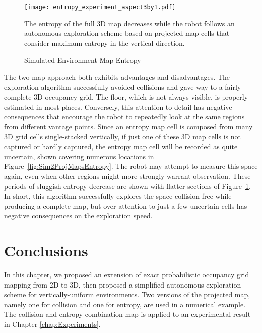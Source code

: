 \begin{figure}[!t]
	\centering
	\texttt{[image: entropy\_experiment\_aspect3by1.pdf]}
	\caption{Simulated Environment Map Entropy}
	\medskip
	\small
	The entropy of the full 3D map decreases while the robot follows an autonomous exploration scheme based on projected map cells that consider maximum entropy in the vertical direction.
	\label{fig:simH}
\end{figure}

The two-map approach both exhibits advantages and disadvantages. The exploration algorithm successfully avoided collisions and gave way to a fairly complete 3D occupancy grid. The floor, which is not always visible, is properly estimated in most places. Conversely, this attention to detail has negative consequences that encourage the robot to repeatedly look at the same regions from different vantage points.
Since an entropy map cell is composed from many 3D grid cells single-stacked vertically, if just one of these 3D map cells is not captured or hardly captured, the entropy map cell will be recorded as quite uncertain, shown covering numerous locations in Figure~\ref{fig:Sim2ProjMapsEntropy}. The robot may attempt to measure this space again, even when other regions might more strongly warrant observation. These periods of sluggish entropy decrease are shown with flatter sections of Figure~\ref{fig:simH}. In short, this algorithm successfully explores the space collision-free while producing a complete map, but over-attention to just a few uncertain cells has negative consequences on the exploration speed.








\section{Conclusions}

In this chapter, we proposed an extension of exact probabilistic occupancy grid mapping from 2D to 3D, then proposed a simplified autonomous exploration scheme for vertically-uniform environments. Two versions of the projected map, namely one for collision and one for entropy, are used in a numerical example. The collision and entropy combination map is applied to an experimental result in Chapter \ref{chap:Experiments}.



